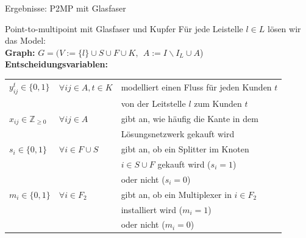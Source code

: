 \documentclass{beamer}
\newcommand{\Z}{\mathbb{Z}}
\begin{document}
\begin{frame}{Ergebnisse: P2MP mit Glasfaser}
\end{frame}

\begin{frame}{Point-to-multipoint mit Glasfaser und Kupfer}
	F\"ur jede Leistelle $l \in L$ l\"osen wir das Model: \\
	\vspace{0.2cm}
	\textbf{Graph:}  $G=(V:=\{l\}\cup S \cup F \cup K ,\: \:   A:= I\backslash I_L \cup A$)\\
	\vspace{0.2cm}
	\textbf{Entscheidungsvariablen:}\\
	\begin{tabular}{lll}
		$y_{ij}^t \in \{0,1\}$ &$\forall ij \in A, t\in K $ & modelliert einen Fluss für jeden Kunden $t$ \\
		&&von der Leitstelle $l$ zum Kunden $t$\\
		$x_{ij} \in \Z_{\geq 0}$ & $\forall ij \in A$ &gibt an, wie häufig die Kante in dem \\
		&&Lösungsnetzwerk gekauft wird\\
		$s_i \in \{0,1\}$ & $\forall i \in F \cup S$ & gibt an, ob ein Splitter im Knoten \\
		&&$i\in S \cup F$ gekauft wird ($s_i=1$)\\
		&&oder nicht ($s_i=0$)\\
		$m_i \in \{0,1\}$ & $\forall i \in F_2$ & gibt an, ob ein Multiplexer in $i\in F_2$\\
		&& installiert wird ($m_i=1$) \\
		&&oder nicht ($m_i=0$)
	\end{tabular}
\end{frame}
\end{document}
